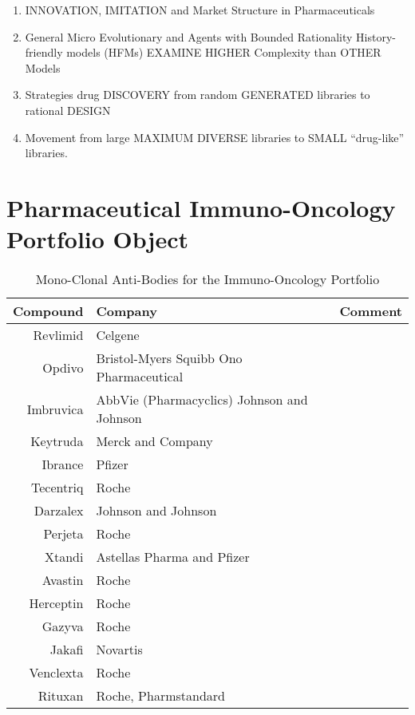
\begin{enumerate}
	\item INNOVATION, IMITATION and Market Structure in Pharmaceuticals \cite{key400}
	\item General Micro Evolutionary and Agents with Bounded Rationality History-friendly models (HFMs) EXAMINE HIGHER Complexity than OTHER Models \cite{key400}
	\item Strategies drug DISCOVERY from random GENERATED libraries to rational DESIGN \cite{key500}
	\item Movement from large MAXIMUM DIVERSE libraries to SMALL “drug-like” libraries. \cite{key500}
\end{enumerate}

\section{Pharmaceutical Immuno-Oncology Portfolio Object}

\begin{table}
	\caption{Mono-Clonal Anti-Bodies for the Immuno-Oncology Portfolio \cite{key8001} }
	\begin{tabular}{r|p{4cm}|l}
		Compound & Company & Comment \\
		\hline
		Revlimid & Celgene & \\
		Opdivo & Bristol-Myers Squibb Ono Pharmaceutical & \\
		Imbruvica & AbbVie (Pharmacyclics) Johnson and Johnson & \\
		Keytruda & Merck and Company & \\
		Ibrance & Pfizer & \\
		Tecentriq & Roche & \\
		Darzalex & Johnson and Johnson & \\
		Perjeta & Roche & \\
		Xtandi & Astellas Pharma and Pfizer & \\
		Avastin & Roche & \\
		Herceptin & Roche & \\
		Gazyva & Roche & \\
		Jakafi & Novartis & \\
		Venclexta & Roche & \\
		Rituxan & Roche, Pharmstandard & \\
		\hline
	\end{tabular}
\end{table}

